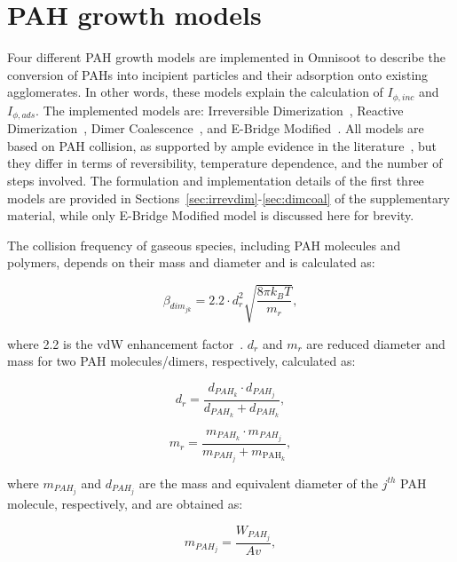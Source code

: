 \section{PAH growth models}
\label{sec:pahgrowmodel}
Four different PAH growth models are implemented in Omnisoot to describe the conversion of PAHs into incipient particles and their adsorption onto existing agglomerates. In other words, these models explain the calculation of $I_{\phi, inc}$ and $I_{\phi, ads}$. The implemented models are: Irreversible Dimerization~\cite{frenklach1991detailed}, Reactive Dimerization~\citep{kholghy2018reactive}, Dimer Coalescence~\citep{blanquart2009joint}, and E-Bridge Modified~\citep{frenklach2020mechanism}. All models are based on PAH collision, as supported by ample evidence in the literature~\citep{zhao2003measurement, abid2009quantitative, happold2009soot}, but they differ in terms of reversibility, temperature dependence, and the number of steps involved. The formulation and implementation details of the first three models are provided in Sections~\ref{sec:irrevdim}-\ref{sec:dimcoal} of the supplementary material, while only E-Bridge Modified model is discussed here for brevity.

The collision frequency of gaseous species, including PAH molecules and polymers, depends on their mass and diameter and is calculated as:

\begin{equation}
	\beta_{dim_{jk}}=
	2.2 \cdot d^2_{r} \sqrt{\frac{8 \pi k_B T}{m_{r}}},
	\label{eqn:betadim}
\end{equation}

\noindent where 2.2 is the vdW enhancement factor~\citep{kholghy2018reactive}. ${d_{r}}$ and ${m_{r}}$ are reduced diameter and mass for two PAH molecules/dimers, respectively, calculated as:

\begin{equation}
	d_{r}=
	\frac{d_{{PAH}_k}\cdot d_{{PAH}_j}}{d_{{PAH}_k}+d_{{PAH}_k}},
	\label{eqn:drPAH}
\end{equation}

\begin{equation}
	m_{r}=
		\frac{m_{{PAH}_k}\cdot m_{{PAH}_j}}{m_{{PAH}_j}+ m_{\mathrm{PAH}_k}},
	\label{eqn:mrPAH}
\end{equation}

\noindent where $m_{PAH_j}$ and $d_{PAH_j}$ are the mass and equivalent diameter of the ${j}^{th}$ PAH molecule, respectively, and are obtained as:

\begin{equation}
	m_{PAH_j}=
	\frac{W_{{PAH}_j}}{Av},
	\label{eqn:mPAH}
\end{equation}

